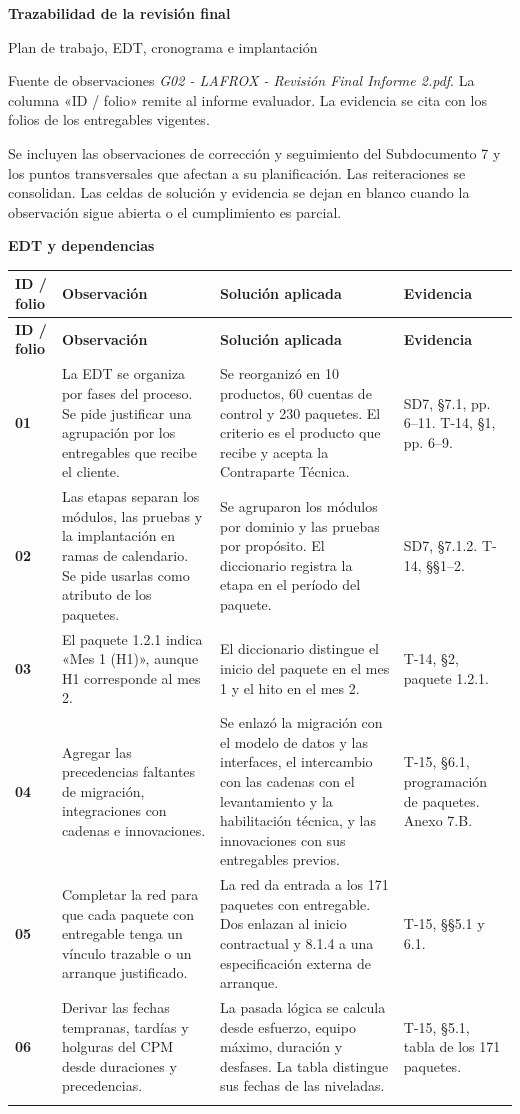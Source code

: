 \documentclass[11pt,letterpaper]{article}
\makeatletter
\newcommand{\tema}[1]{\par{\Large\bfseries #1}\par}
\newcommand{\cabecera}{\rowcolor{fondo}
  \textbf{ID / folio} & \textbf{Observación} & \textbf{Solución aplicada} & \textbf{Evidencia}\\}
\newenvironment{matriz}{%
  \fontsize{10}{13}\selectfont
  \begin{longtable}{@{}>{\RaggedRight\arraybackslash}p{.099\linewidth}
                      >{\RaggedRight\arraybackslash}p{.360\linewidth}
                      >{\RaggedRight\arraybackslash}p{.329\linewidth}
                      >{\RaggedRight\arraybackslash}p{.152\linewidth}@{}}
    \cabecera\endfirsthead
    \cabecera\endhead
}{\end{longtable}\normalsize}
\newcommand{\observacion}[5]{%
  \rule{0pt}{2.3ex}\textbf{#1}\newline {\footnotesize #2} &
  #3 & #4 & #5 \\[2pt]\arrayrulecolor{regla}\midrule}
\makeatother
\begin{document}
{\LARGE\bfseries Trazabilidad de la revisión final\par}
{\large Plan de trabajo, EDT, cronograma e implantación\par}

Fuente de observaciones \emph{G02 - LAFROX - Revisión Final Informe 2.pdf}.
La columna «ID / folio» remite al informe evaluador. La evidencia se cita
con los folios de los entregables vigentes.

Se incluyen las observaciones de corrección y seguimiento del Subdocumento 7 y
los puntos transversales que afectan a su planificación. Las reiteraciones se
consolidan. Las celdas de solución y evidencia se dejan en blanco cuando la
observación sigue abierta o el cumplimiento es parcial.

\tema{EDT y dependencias}
\begin{matriz}
\observacion{01}{27--28, 33, 53--54}
{La EDT se organiza por fases del proceso. Se pide justificar una agrupación por los entregables que recibe el cliente.}
{Se reorganizó en 10 productos, 60 cuentas de control y 230 paquetes. El criterio es el producto que recibe y acepta la Contraparte Técnica.}
{SD7, §7.1, pp. 6--11. T-14, §1, pp. 6--9.}
\observacion{02}{27--28, 33, 53--54}
{Las etapas separan los módulos, las pruebas y la implantación en ramas de calendario. Se pide usarlas como atributo de los paquetes.}
{Se agruparon los módulos por dominio y las pruebas por propósito. El diccionario registra la etapa en el período del paquete.}
{SD7, §7.1.2. T-14, §§1--2.}
\observacion{03}{28}
{El paquete 1.2.1 indica «Mes 1 (H1)», aunque H1 corresponde al mes 2.}
{El diccionario distingue el inicio del paquete en el mes 1 y el hito en el mes 2.}
{T-14, §2, paquete 1.2.1.}
\observacion{04}{30, 33, 54}
{Agregar las precedencias faltantes de migración, integraciones con cadenas e innovaciones.}
{Se enlazó la migración con el modelo de datos y las interfaces, el intercambio con las cadenas con el levantamiento y la habilitación técnica, y las innovaciones con sus entregables previos.}
{T-15, §6.1, programación de paquetes. Anexo 7.B.}
\observacion{05}{30, 33, 54}
{Completar la red para que cada paquete con entregable tenga un vínculo trazable o un arranque justificado.}
{La red da entrada a los 171 paquetes con entregable. Dos enlazan al inicio contractual y 8.1.4 a una especificación externa de arranque.}
{T-15, §§5.1 y 6.1.}
\observacion{06}{27, 30, 33, 54}
{Derivar las fechas tempranas, tardías y holguras del CPM desde duraciones y precedencias.}
{La pasada lógica se calcula desde esfuerzo, equipo máximo, duración y desfases. La tabla distingue sus fechas de las niveladas.}
{T-15, §5.1, tabla de los 171 paquetes.}
\end{matriz}
\end{document}
